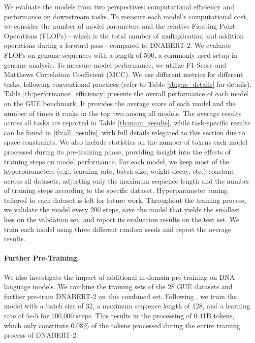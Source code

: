 \documentclass{article}
\begin{document}
We evaluate the models from two perspectives: computational efficiency and performance on downstream tasks. To measure each model's computational cost, we consider the number of model parameters and the relative Floating Point Operations (FLOPs)—which is the total number of multiplication and addition operations during a forward pass—compared to DNABERT-2. We evaluate FLOPs on genome sequences with a length of 500, a commonly used setup in genome analysis. To measure model performance, we utilize F1-Score and Matthews Correlation Coefficient (MCC). We use different metrics for different tasks, following conventional practices (refer to Table \ref{tb:gue_details} for details).
Table \ref{tb:performance_efficiency} presents the overall performance of each model on the GUE benchmark. It provides the average score of each model and the number of times it ranks in the top two among all models. The average results across all tasks are reported in Table \ref{tb:main_results}, while task-specific results can be found in \ref{tb:all_results}, with full details relegated to this section due to space constraints. We also include statistics on the number of tokens each model processed during its pre-training phase, providing insight into the effects of training steps on model performance.
For each model, we keep most of the hyperparameters (e.g., learning rate, batch size, weight decay, etc.) constant across all datasets, adjusting only the maximum sequence length and the number of training steps according to the specific dataset. Hyperparameter tuning tailored to each dataset is left for future work. Throughout the training process, we validate the model every 200 steps, save the model that yields the smallest loss on the validation set, and report its evaluation results on the test set. We train each model using three different random seeds and report the average results.
\paragraph{Further Pre-Training.} We also investigate the impact of additional in-domain pre-training on DNA language models. We combine the training sets of the 28 GUE datasets and further pre-train DNABERT-2 on this combined set. Following \citet{sun2020finetune}, we train the model with a batch size of 32, a maximum sequence length of 128, and a learning rate of $5e\texttt{-}5$ for 100,000 steps. This results in the processing of 0.41B tokens, which only constitute 0.08\% of the tokens processed during the entire training process of DNABERT-2.
\end{document}
